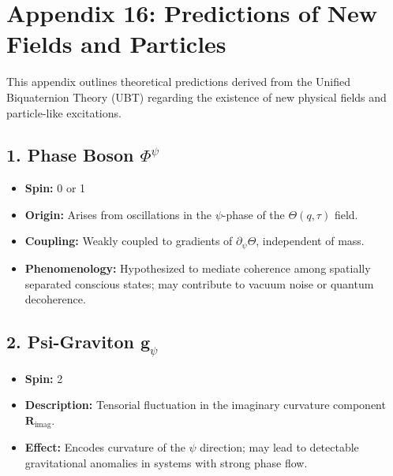 

\appendix
\section*{Appendix 16: Predictions of New Fields and Particles}

This appendix outlines theoretical predictions derived from the Unified Biquaternion Theory (UBT) regarding the existence of new physical fields and particle-like excitations.

\subsection*{1. Phase Boson \(\Phi^\psi\)}

\begin{itemize}
  \item \textbf{Spin:} 0 or 1
  \item \textbf{Origin:} Arises from oscillations in the \(\psi\)-phase of the \(\Theta(q,\tau)\) field.
  \item \textbf{Coupling:} Weakly coupled to gradients of \(\partial_\psi \Theta\), independent of mass.
  \item \textbf{Phenomenology:} Hypothesized to mediate coherence among spatially separated conscious states; may contribute to vacuum noise or quantum decoherence.
\end{itemize}

\subsection*{2. Psi-Graviton \(\mathbf{g}_{\psi}\)}

\begin{itemize}
  \item \textbf{Spin:} 2
  \item \textbf{Description:} Tensorial fluctuation in the imaginary curvature component \(\mathbf{R}_{\text{imag}}\).
  \item \textbf{Effect:} Encodes curvature of the \(\psi\) direction; may lead to detectable gravitational anomalies in systems with strong phase flow.
\end{itemize}

